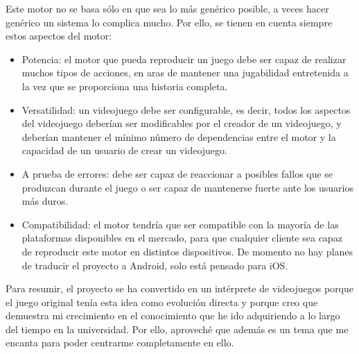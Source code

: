 Este motor no se basa sólo en que sea lo más genérico posible, a veces hacer genérico un sistema lo complica mucho. Por ello, se tienen en cuenta siempre estos aspectos del motor:
\begin{itemize}
	\item Potencia: el motor que pueda reproducir un juego debe ser capaz de realizar muchos tipos de acciones, en aras de mantener una jugabilidad entretenida a la vez que se proporciona una historia completa.
	\item Versatilidad: un videojuego debe ser configurable, es decir, todos los aspectos del videojuego deberían ser modificables por el creador de un videojuego, y deberían mantener el mínimo número de dependencias entre el motor y la capacidad de un usuario de crear un videojuego. 
	\item A prueba de errores: debe ser capaz de reaccionar a posibles fallos que se produzcan durante el juego o ser capaz de mantenerse fuerte ante los usuarios más duros.
	\item Compatibilidad: el motor tendría que ser compatible con la mayoría de las plataformas disponibles en el mercado, para que cualquier cliente sea capaz de reproducir este motor en distintos dispositivos. De momento no hay planes de traducir el proyecto a Android, solo está pensado para iOS.
\end{itemize}

Para resumir, el proyecto se ha convertido en un intérprete de videojuegos porque el juego original tenía esta idea como evolución directa y porque creo que demuestra mi crecimiento en el conocimiento que he ido adquiriendo a lo largo del tiempo en la universidad. Por ello, aproveché que además es un tema que me encanta para poder centrarme completamente en ello.

